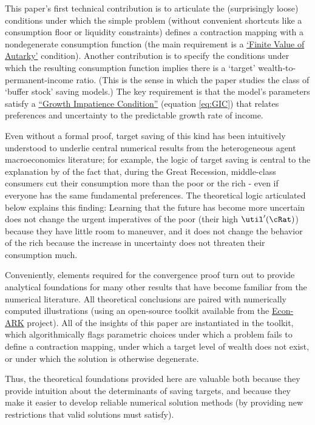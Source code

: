 \documentclass[./BufferStockTheory.tex]{subfiles}
\begin{document}
This paper's first technical contribution is to articulate the (surprisingly loose) conditions under which the simple problem (without convenient shortcuts like a consumption floor or liquidity constraints) defines a contraction mapping with a nondegenerate consumption function (the main requirement is a \hyperlink{FVAC}{`Finite Value of Autarky'} condition).  Another contribution is to specify the conditions under which the resulting consumption function implies there is a `target' wealth-to-permanent-income ratio.  (This is the sense in which the paper studies the class of `buffer stock' saving models.)  The key requirement is that the model's parameters satisfy a \hyperlink{GIC}{``Growth Impatience Condition''} (equation \eqref{eq:GIC}) that relates preferences and uncertainty to the predictable growth rate of income.

\hypertarget{KMP}{}

Even without a formal proof, target saving of this kind has been intuitively understood to underlie central numerical results from the heterogeneous agent macroeconomics literature; for example, the logic of target saving is central to the explanation by \cite{kmpHandbook} of the fact that, during the Great Recession, middle-class consumers cut their consumption more than the poor or the rich - even if everyone has the same fundamental preferences.  The theoretical logic articulated below explains this finding:  Learning that the future has become more uncertain does not change the urgent imperatives of the poor (their high $\util^{\prime}(\cRat)$) because they have little room to maneuver, and it does not change the behavior of the rich because the increase in uncertainty does not threaten their consumption much.  

Conveniently, elements required for the convergence proof turn out to provide analytical foundations for many other results that have become familiar from the numerical literature.  All theoretical conclusions are paired with numerically computed illustrations (using an open-source toolkit available from the \href{https://github.com/econ-ark/REMARK/blob/master/REMARKs/BufferStockTheory/BufferStockTheory.ipynb}{Econ-ARK} project).  All of the insights of this paper are instantiated in the toolkit, which algorithmically flags parametric choices under which a problem fails to define a contraction mapping, under which a target level of wealth does not exist, or under which the solution is otherwise degenerate.

Thus, the theoretical foundations provided here are valuable both because they provide intuition about the determinants of saving targets, and because they make it easier to develop reliable numerical solution methods (by providing new restrictions that valid solutions must satisfy).
\end{document}
